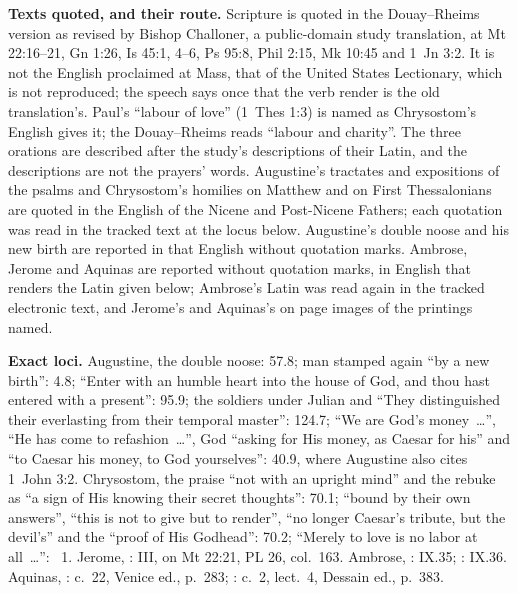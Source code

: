 {\textbf{Texts quoted, and their route.} Scripture is quoted in the
Douay--Rheims version as revised by Bishop Challoner, a public-domain study
translation, at Mt 22:16--21, Gn 1:26, Is 45:1, 4--6, Ps 95:8, Phil 2:15,
Mk 10:45 and 1~Jn 3:2. It is not the English proclaimed at Mass, that of the
United States Lectionary, which is not reproduced; the speech says once that
the verb render is the old translation's. Paul's ``labour of love'' (1~Thes 1:3) is named as Chrysostom's English gives it; the
Douay--Rheims reads ``labour and charity''. The three orations are described
after the study's descriptions of their Latin, and the descriptions are not
the prayers' words. Augustine's tractates and expositions of the
psalms and Chrysostom's homilies on Matthew and on First Thessalonians are
quoted in the English of the Nicene and Post-Nicene Fathers; each quotation
was read in the tracked text at the locus below. Augustine's double noose and
his new birth are reported in that English without quotation marks. Ambrose,
Jerome and Aquinas are reported without quotation marks, in English that
renders the Latin given below; Ambrose's Latin was read again in the tracked
electronic text, and Jerome's and Aquinas's on page images of the printings
named.

\textbf{Exact loci.} Augustine, the double noose:  57.8; man stamped again ``by a new birth'': 4.8; ``Enter with an
humble heart into the house of God, and thou hast entered with a present'':
95.9; the soldiers under Julian and ``They distinguished their everlasting
from their temporal master'': 124.7; ``We are God's money~\ldots'', ``He has
come to refashion~\ldots'', God ``asking for His money, as Caesar for his'' and
``to Caesar his money, to God yourselves'':  40.9, where Augustine also cites 1~John 3:2. Chrysostom, the praise
``not with an upright mind'' and the rebuke as ``a sign of His knowing their
secret thoughts'':  70.1; ``bound by their own
answers'', ``this is not to give but to render'', ``no longer Caesar's tribute,
but the devil's'' and the ``proof of His Godhead'': 70.2; ``Merely to love is
no labor at all~\ldots'': ~1. Jerome,
:  III, on Mt 22:21, PL 26, col.~163. Ambrose, :  IX.35; :
IX.36. Aquinas, :  c.~22, Venice ed., p.~283; :  c.~2, lect.~4, Dessain
ed., p.~383.

\par}

